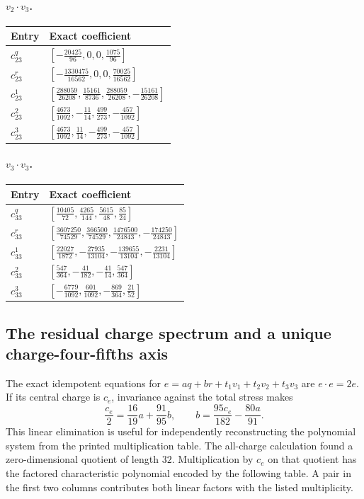 \paragraph{$v_2\cdot v_3$.}
\begin{longtable}{@{}ll@{}}
\toprule
Entry&Exact coefficient\\
\midrule\endhead
$c^{q}_{23}$&$[-\frac{20425}{96},0,0,\frac{1075}{96}]$\\[3pt]
$c^{r}_{23}$&$[-\frac{1330475}{16562},0,0,\frac{70025}{16562}]$\\[3pt]
$c^{1}_{23}$&$[\frac{288059}{26208},\frac{15161}{8736},\frac{288059}{26208},-\frac{15161}{26208}]$\\[3pt]
$c^{2}_{23}$&$[\frac{4673}{1092},-\frac{11}{14},\frac{499}{273},-\frac{457}{1092}]$\\[3pt]
$c^{3}_{23}$&$[\frac{4673}{1092},\frac{11}{14},-\frac{499}{273},-\frac{457}{1092}]$\\[3pt]
\bottomrule
\end{longtable}
\paragraph{$v_3\cdot v_3$.}
\begin{longtable}{@{}ll@{}}
\toprule
Entry&Exact coefficient\\
\midrule\endhead
$c^{q}_{33}$&$[\frac{10405}{72},\frac{4265}{144},\frac{5615}{48},\frac{85}{24}]$\\[3pt]
$c^{r}_{33}$&$[\frac{3607250}{74529},\frac{366500}{74529},\frac{1476500}{24843},-\frac{174250}{24843}]$\\[3pt]
$c^{1}_{33}$&$[\frac{22027}{1872},-\frac{27935}{13104},-\frac{139655}{13104},-\frac{2231}{13104}]$\\[3pt]
$c^{2}_{33}$&$[\frac{547}{364},-\frac{41}{182},-\frac{41}{14},\frac{547}{364}]$\\[3pt]
$c^{3}_{33}$&$[-\frac{6779}{1092},\frac{601}{1092},-\frac{869}{364},\frac{21}{52}]$\\[3pt]
\bottomrule
\end{longtable}

\subsection{The residual charge spectrum and a unique charge-four-fifths axis}
\label{expstructure:axes}

The exact idempotent equations for
$e=aq+br+t_1v_1+t_2v_2+t_3v_3$ are $e\cdot e=2e$.
If its central charge is $c_e$, invariance against the total stress
makes
\[
 \frac{c_e}{2}=\frac{16}{19}a+\frac{91}{95}b,
 \qquad b=\frac{95c_e}{182}-\frac{80a}{91}.
\]
This linear elimination is useful for independently reconstructing
the polynomial system from the printed multiplication table. The
all-charge calculation found a zero-dimensional quotient of length
$32$. Multiplication by $c_e$ on that quotient has the factored
characteristic polynomial encoded by the following table. A pair in
the first two columns contributes both linear factors with the listed
multiplicity.

